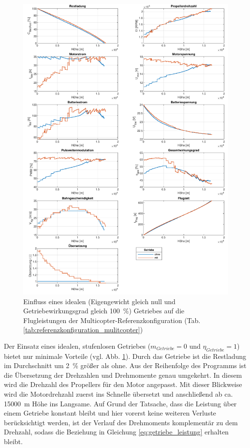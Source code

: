 \begin{figure}[H]
\centering
	\includegraphics[scale=0.7]{Diagramme/Getriebe.pdf}
	\caption{Einfluss eines idealen (Eigengewicht gleich null und Getriebewirkungsgrad gleich \SI{100}{\%}) Getriebes auf die Flugleistungen der Multicopter-Referenzkonfiguration (Tab. \ref{tab:referenzkonfiguration_mulitcopter})}
	\label{abb:getriebe}
\end{figure}
Der Einsatz eines idealen, stufenlosen Getriebes (\ensuremath{m_{Getriebe} = 0} und \ensuremath{\eta_{Getriebe} = 1}) bietet nur minimale Vorteile (vgl. Abb. \ref{abb:getriebe}). Durch das Getriebe ist die Restladung im Durchschnitt um \SI{2}{\%} größer als ohne. Aus der Reihenfolge des Programms ist die Übersetzung der Drehzahlen und Drehmomente genau umgekehrt. In diesem wird die Drehzahl des Propellers für den Motor angepasst. Mit dieser Blickweise wird die Motordrehzahl zuerst ins Schnelle übersetzt und anschließend ab ca. \SI{15000}{m} Höhe ins Langsame. Auf Grund der Tatsache, dass die Leistung über einem Getriebe konstant bleibt und hier vorerst keine weiteren Verluste berücksichtigt werden, ist der Verlauf des Drehmoments komplementär zu dem Drehzahl, sodass die Beziehung in Gleichung \ref{eq:getriebe_leistung} erhalten bleibt. \\

